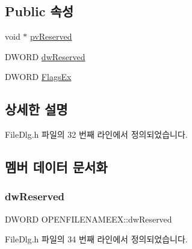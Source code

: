 \subsection*{Public 속성}
\begin{DoxyCompactItemize}
\item 
void $\ast$ \mbox{\hyperlink{struct_o_p_e_n_f_i_l_e_n_a_m_e_e_x_a7a86ce8d401fd1e27346e6ed40ece33a}{pv\+Reserved}}
\item 
D\+W\+O\+RD \mbox{\hyperlink{struct_o_p_e_n_f_i_l_e_n_a_m_e_e_x_a81b2e87ff9ffc00a50e73b3bc6a25e17}{dw\+Reserved}}
\item 
D\+W\+O\+RD \mbox{\hyperlink{struct_o_p_e_n_f_i_l_e_n_a_m_e_e_x_a287159f9ba4611835b31d46af8ddba6d}{Flags\+Ex}}
\end{DoxyCompactItemize}


\subsection{상세한 설명}


File\+Dlg.\+h 파일의 32 번째 라인에서 정의되었습니다.



\subsection{멤버 데이터 문서화}
\mbox{\label{struct_o_p_e_n_f_i_l_e_n_a_m_e_e_x_a81b2e87ff9ffc00a50e73b3bc6a25e17}} 
\subsubsection{\texorpdfstring{dw\+Reserved}{dwReserved}}
{\footnotesize\ttfamily D\+W\+O\+RD O\+P\+E\+N\+F\+I\+L\+E\+N\+A\+M\+E\+E\+X\+::dw\+Reserved}



File\+Dlg.\+h 파일의 34 번째 라인에서 정의되었습니다.

\mbox{\label{struct_o_p_e_n_f_i_l_e_n_a_m_e_e_x_a287159f9ba4611835b31d46af8ddba6d}} 
